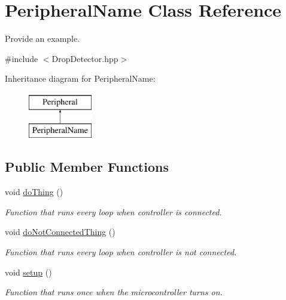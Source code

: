 \hypertarget{class_peripheral_name}{}\section{Peripheral\+Name Class Reference}
\label{class_peripheral_name}


Provide an example.  




{\ttfamily \#include $<$Drop\+Detector.\+hpp$>$}

Inheritance diagram for Peripheral\+Name\+:\begin{figure}[H]
\begin{center}
\leavevmode
\includegraphics[height=2.000000cm]{class_peripheral_name}
\end{center}
\end{figure}
\subsection*{Public Member Functions}
\begin{DoxyCompactItemize}
\item 
void \mbox{\hyperlink{class_peripheral_name_a42388889799a14fd6cda2c2819b0e38d}{do\+Thing}} ()
\begin{DoxyCompactList}\small\item\em Function that runs every loop when controller is connected. \end{DoxyCompactList}\item 
void \mbox{\hyperlink{class_peripheral_name_a63b193d5328d4800de3bb8905f1d2f20}{do\+Not\+Connected\+Thing}} ()
\begin{DoxyCompactList}\small\item\em Function that runs every loop when controller is not connected. \end{DoxyCompactList}\item 
void \mbox{\hyperlink{class_peripheral_name_aa6b1719095b6e25d80a2567f400316db}{setup}} ()
\begin{DoxyCompactList}\small\item\em Function that runs once when the microcontroller turns on. \end{DoxyCompactList}\end{DoxyCompactItemize}


